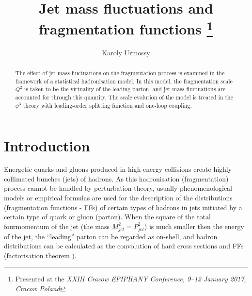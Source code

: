 \documentclass{appolb}
\begin{document}
\title{Jet mass fluctuations and\\fragmentation functions%
\thanks{Presented at the \textit{XXIII Cracow EPIPHANY Conference, 9--12 January 2017, Cracow Poland}}%
}
\author{Karoly Urmossy
\address{Institute of physics, Jan Kochanowski University\\15 Swietokrzyska Street,
PL-25406 Kielce, Poland}
}

\maketitle
\begin{abstract}
The effect of jet mass fluctuations on the fragmentation process is examined in the framework of a statistical hadronisation model. In this model, the fragmentation scale $Q^2$ is taken to be the virtuality of the leading parton, and jet mass fluctuations are accounted for through this quantity. The scale evolution of the model is treated in the $\phi^3$ theory with leading-order splitting function and one-loop coupling.  
\end{abstract}
  
\section{Introduction}
\label{sec:intro}
Energetic quarks and gluons produced in high-energy collisions create highly collimated bunches (jets) of hadrons. As this hadronisation (fragmentation) process cannot be handled by perturbation theory, usually phenomenological models or empirical formulas are used for the description of the distributions (fragmentation functions - FFs) of certain types of hadrons in jets initiated by a certain type of quark or gluon (parton). When the square of the total fourmomentum of the jet (the mass $M_{jet}^2 = P_{jet}^2$) is much smaller then the energy of the jet, the ``leading'' parton can be regarded as on-shell, and hadron distributions can be calculated as the convolution of hard cross sections and FFs (factorisation theorem \cite{bib:Fact,bib:css}).
\end{document}
